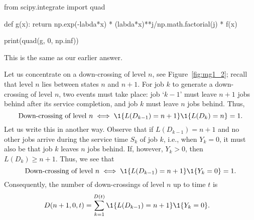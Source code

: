\begin{exercise}[\faPhoto]
\begin{solution}
\begin{pyconsole}
from scipy.integrate import quad

def g(x):
    return np.exp(-labda*x) * (labda*x)**j/np.math.factorial(j) * f(x)

print(quad(g, 0, np.inf))
\end{pyconsole}

This is the same as our earlier answer.
\end{solution}
\end{exercise}


Let us concentrate on a down-crossing of level $n$, see
Figure~\ref{fig:mg1_2}; recall that level $n$ lies between states $n$
and $n+1$. For job $k$ to generate a down-crossing of level $n$, two events must take place: 
 job `$k-1$' must leave $n+1$ jobs behind after its service completion, and  job $k$ must leave $n$ jobs behind. Thus, 
 \begin{equation*}
   \text{Down-crossing of level $n$} \iff \1{L(D_{k-1}) = n+1}\1{L(D_k)=n} = 1.
 \end{equation*}
Let us write this in another
way. Observe that if $L(D_{k-1})=n+1$ and no other jobs arrive during
the service time $S_k$ of job $k$, i.e., when $Y_k=0$, it must also be
that job $k$ leaves $n$ jobs behind. If, however, $Y_k>0$, then
$L(D_k)\geq n+1$.  Thus, we see that
 \begin{equation*}
   \text{Down-crossing of level $n$} \iff \1{L(D_{k-1}) = n+1}\1{Y_k=0} = 1.
 \end{equation*}
Consequently, the number of down-crossings of level $n$ up to time $t$ is
\begin{equation*}
  \begin{split}
  D(n+1, 0, t) 
&= \sum_{k=1}^{D(t)}\1{L(D_{k-1})=n+1}\1{Y_k=0}.
  \end{split}
\end{equation*}

